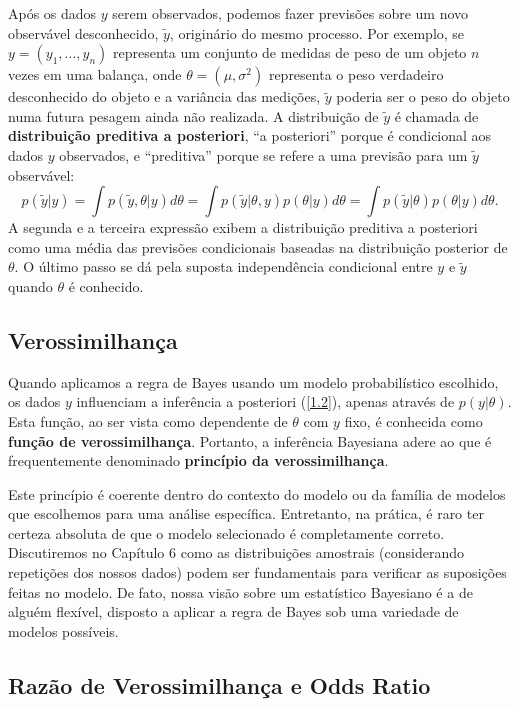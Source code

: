 Após os dados $ y $ serem observados, podemos fazer previsões sobre um novo observável desconhecido, $ \tilde{y} $, originário do mesmo processo. Por exemplo, se $ y = (y_1,...,y_n) $ representa um conjunto de medidas de peso de um objeto $ n $ vezes em uma balança, onde $ \theta = (\mu, \sigma^2) $ representa o peso verdadeiro desconhecido do objeto e a variância das medições, $ \tilde{y} $ poderia ser o peso do objeto numa futura pesagem ainda não realizada. A distribuição de $ \tilde{y} $ é chamada de \textbf{distribuição preditiva a posteriori}, ``a posteriori'' porque é condicional aos dados $ y $ observados, e ``preditiva'' porque se refere a uma previsão para um $ \tilde{y} $ observável:
\begin{equation}
p(\tilde{y}|y) = \int p(\tilde{y}, \theta|y)d\theta = \int p(\tilde{y}|\theta, y)p(\theta|y)d\theta = \int p(\tilde{y}|\theta)p(\theta|y)d\theta.
\end{equation}
A segunda e a terceira expressão exibem a distribuição preditiva a posteriori como uma média das previsões condicionais baseadas na distribuição posterior de $ \theta $. O último passo se dá pela suposta independência condicional entre $ y $ e $ \tilde{y} $ quando $ \theta $ é conhecido.

\subsection{Verossimilhança}

Quando aplicamos a regra de Bayes usando um modelo probabilístico escolhido, os dados $ y $ influenciam a inferência a posteriori (\autoref{1.2}), apenas através de $ p(y|\theta) $. Esta função, ao ser vista como dependente de $ \theta $ com $ y $ fixo, é conhecida como \textbf{função de verossimilhança}. Portanto, a inferência Bayesiana adere ao que é frequentemente denominado \textbf{princípio da verossimilhança}.

Este princípio é coerente dentro do contexto do modelo ou da família de modelos que escolhemos para uma análise específica. Entretanto, na prática, é raro ter certeza absoluta de que o modelo selecionado é completamente correto. Discutiremos no Capítulo 6 como as distribuições amostrais (considerando repetições dos nossos dados) podem ser fundamentais para verificar as suposições feitas no modelo. De fato, nossa visão sobre um estatístico Bayesiano é a de alguém flexível, disposto a aplicar a regra de Bayes sob uma variedade de modelos possíveis.

\subsection{Razão de Verossimilhança e Odds Ratio}
	
